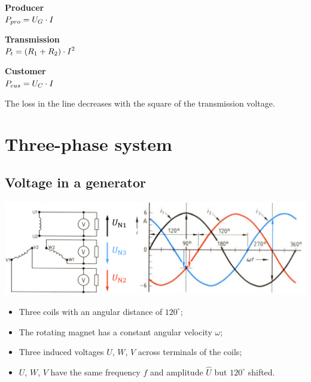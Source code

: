 \documentclass{article}
\begin{document}
\begin{center}
    \begin{minipage}[t]{0.3\textwidth}
        \centering
        \textbf{Producer}\\[1ex]
        $\displaystyle P_{pro} = U_G\cdot I$
    \end{minipage}
    \hfill
    \begin{minipage}[t]{0.3\textwidth}
        \centering
        \textbf{Transmission}\\[1ex]
        $\displaystyle P_{t} = (R_1+R_2)\cdot I^2$
    \end{minipage}
    \hfill
    \begin{minipage}[t]{0.3\textwidth}
        \centering
        \textbf{Customer}\\[1ex]
        $\displaystyle P_{cus} = U_C\cdot I$
    \end{minipage}
\end{center}
\vspace*{.5cm}


The loss in the line decreases with the square of the transmission voltage.

\section{Three-phase system}
\subsection{Voltage in a generator}
\begin{center}
    \includegraphics[width=.9\textwidth]{media/generator.png}
\end{center}
\begin{itemize}
    \item Three coils with an angular distance of $120^{\circ}$;
    \item The rotating magnet has a constant angular velocity $\omega$;
    \item Three induced voltages $U$, $W$, $V$ across terminals of the coils;
    \item $U$, $W$, $V$ have the same frequency $f$ and amplitude $\widehat{U}$ but $120^{\circ}$ shifted.
\end{itemize}
\end{document}
